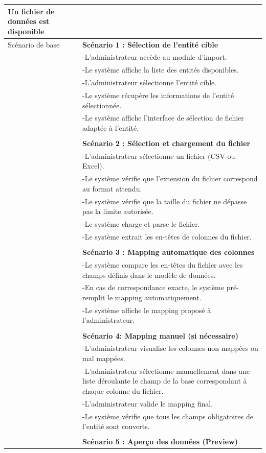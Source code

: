 \begin{longtable}{|l|p{12cm}|}
     Un fichier de données est disponible
 \\
\hline
Scénario de base & 
\textbf{Scénario 1 : Sélection de l'entité cible} \\
&-L'administrateur accède au module d'import. \\
&-Le système affiche la liste des entités disponibles. \\
&-L'administrateur sélectionne l'entité cible. \\
&-Le système récupère les informations de l'entité sélectionnée. \\
&-Le système affiche l'interface de sélection de fichier adaptée à l'entité. \\
\\
& \textbf{Scénario 2 : Sélection et chargement du fichier} \\
&-L'administrateur sélectionne un fichier (CSV ou Excel). \\
&-Le système vérifie que l'extension du fichier correspond au format attendu. \\
&-Le système vérifie que la taille du fichier ne dépasse pas la limite autorisée. \\
&-Le système charge et parse le fichier. \\
&-Le système extrait les en-têtes de colonnes du fichier. \\
\\
& \textbf{Scénario 3 : Mapping automatique des colonnes} \\
&-Le système compare les en-têtes du fichier avec les champs définis dans le modèle de données. \\
&-En cas de correspondance exacte, le système pré-remplit le mapping automatiquement. \\
&-Le système affiche le mapping proposé à l'administrateur. \\
\\
& \textbf{Scénario 4: Mapping manuel (si nécessaire)} \\
&-L'administrateur visualise les colonnes non mappées ou mal mappées. \\
&-L'administrateur sélectionne manuellement dans une liste déroulante le champ de la base correspondant à chaque colonne du fichier. \\
&-L'administrateur valide le mapping final. \\
&-Le système vérifie que tous les champs obligatoires de l'entité sont couverts. \\
\\
& \textbf{Scénario 5 : Aperçu des données (Preview)} \\

\end{longtable}
